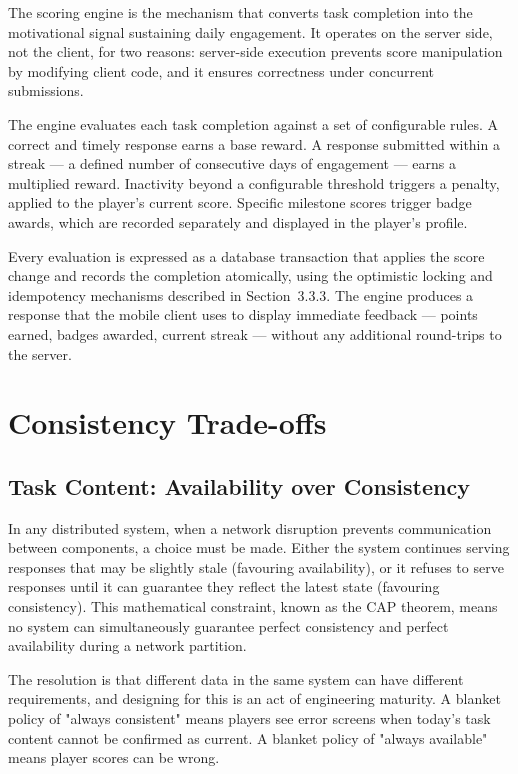 The scoring engine is the mechanism that converts task completion into the motivational signal sustaining daily engagement. It operates on the server side, not the client, for two reasons: server-side execution prevents score manipulation by modifying client code, and it ensures correctness under concurrent submissions.

The engine evaluates each task completion against a set of configurable rules. A correct and timely response earns a base reward. A response submitted within a streak --- a defined number of consecutive days of engagement --- earns a multiplied reward. Inactivity beyond a configurable threshold triggers a penalty, applied to the player's current score. Specific milestone scores trigger badge awards, which are recorded separately and displayed in the player's profile.

Every evaluation is expressed as a database transaction that applies the score change and records the completion atomically, using the optimistic locking and idempotency mechanisms described in Section~3.3.3. The engine produces a response that the mobile client uses to display immediate feedback --- points earned, badges awarded, current streak --- without any additional round-trips to the server.

\section{Consistency Trade-offs}

\subsection{Task Content: Availability over Consistency}

In any distributed system, when a network disruption prevents communication between components, a choice must be made. Either the system continues serving responses that may be slightly stale (favouring availability), or it refuses to serve responses until it can guarantee they reflect the latest state (favouring consistency). This mathematical constraint, known as the CAP theorem, means no system can simultaneously guarantee perfect consistency and perfect availability during a network partition.

The resolution is that different data in the same system can have different requirements, and designing for this is an act of engineering maturity. A blanket policy of "always consistent" means players see error screens when today's task content cannot be confirmed as current. A blanket policy of "always available" means player scores can be wrong.

